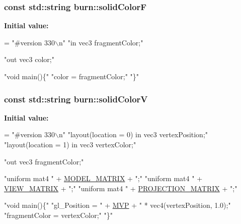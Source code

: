\hypertarget{namespaceburn_ab930855fc914e51fe8d7f734a5534c6d}{
\subsubsection[{solid\-Color\-F}]{\setlength{\rightskip}{0pt plus 5cm}const std\-::string burn\-::solid\-Color\-F}}\label{namespaceburn_ab930855fc914e51fe8d7f734a5534c6d}
{\bfseries Initial value\-:}
\begin{DoxyCode}
= \textcolor{stringliteral}{"#version 330\(\backslash\)n"}
        \textcolor{stringliteral}{"in vec3 fragmentColor;"}

        \textcolor{stringliteral}{"out vec3 color;"}

        \textcolor{stringliteral}{"void main()\{"}
            \textcolor{stringliteral}{"color = fragmentColor;"}
        \textcolor{stringliteral}{"\}"}
\end{DoxyCode}
\hypertarget{namespaceburn_a6eafdfe4d85acab9368409999e505dd3}{
\subsubsection[{solid\-Color\-V}]{\setlength{\rightskip}{0pt plus 5cm}const std\-::string burn\-::solid\-Color\-V}}\label{namespaceburn_a6eafdfe4d85acab9368409999e505dd3}
{\bfseries Initial value\-:}
\begin{DoxyCode}
= \textcolor{stringliteral}{"#version 330\(\backslash\)n"}
        \textcolor{stringliteral}{"layout(location = 0) in vec3 vertexPosition;"}
        \textcolor{stringliteral}{"layout(location = 1) in vec3 vertexColor;"}

        \textcolor{stringliteral}{"out vec3 fragmentColor;"}

        \textcolor{stringliteral}{"uniform mat4 "} + \hyperlink{namespaceburn_aef2bc91c4c84fa143da611ee2f284c8b}{MODEL\_MATRIX} + \textcolor{stringliteral}{";"}
        \textcolor{stringliteral}{"uniform mat4 "} + \hyperlink{namespaceburn_a7cb7c6572d4f7796ea3e5edae85e51f1}{VIEW\_MATRIX} + \textcolor{stringliteral}{";"}
        \textcolor{stringliteral}{"uniform mat4 "} + \hyperlink{namespaceburn_ae5e90743826abef0fbc9d54704ae2a6f}{PROJECTION\_MATRIX} + \textcolor{stringliteral}{";"}

        \textcolor{stringliteral}{"void main()\{"}
            \textcolor{stringliteral}{"gl\_Position = "} + \hyperlink{namespaceburn_a7c71b053f299e14c880f0f11ba916a44}{MVP} + \textcolor{stringliteral}{" * vec4(vertexPosition, 1.0);"}
            \textcolor{stringliteral}{"fragmentColor = vertexColor;"}
        \textcolor{stringliteral}{"\}"}
\end{DoxyCode}
